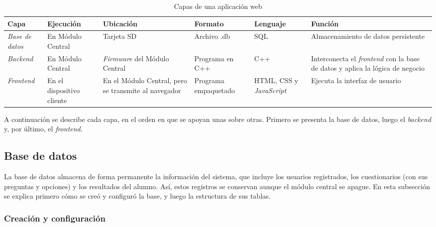 \begin{table}[H]
    \centering
    \caption{Capas de una aplicación web}
    \label{tab:capas_app_web}
    \begin{tabular}{|>{\raggedright\arraybackslash}p{}|>{\raggedright\arraybackslash}p{}|>{\raggedright\arraybackslash}p{}|>{\raggedright\arraybackslash}p{}|>{\raggedright\arraybackslash}p{}|>{\raggedright\arraybackslash}p{}|}
        \hline
        \textbf{Capa} & \textbf{Ejecución} & \textbf{Ubicación} & \textbf{Formato} & \textbf{Lenguaje} & \textbf{Función} \\
        \hline
        \emph{Base de datos} & En Módulo Central & Tarjeta SD & Archivo .db & SQL & Almacenamiento de datos persistente \\
        \hline
        \emph{Backend} & En Módulo Central & \emph{Firmware} del Módulo Central & Programa en C++ & C++ & Interconecta el \emph{frontend} con la base de datos y aplica la lógica de negocio \\
        \hline
        \emph{Frontend} & En el dispositivo cliente & En el Módulo Central, pero se transmite al navegador & Programa empaquetado & HTML, CSS y \emph{JavaScript} & Ejecuta la interfaz de usuario \\
        \hline
    \end{tabular}
\end{table}

A continuación se describe cada capa, en el orden en que se apoyan unas sobre otras. Primero se presenta la base de datos, luego el \emph{backend} y, por último, el \emph{frontend}.

\subsection{Base de datos}
\label{sec:base_datos}

La base de datos almacena de forma permanente la información del sistema, que incluye los usuarios registrados, los cuestionarios (con sus preguntas y opciones) y los resultados del alumno. Así, estos registros se conservan aunque el módulo central se apague. En esta subsección se explica primero cómo se creó y configuró la base, y luego la estructura de sus tablas.

\subsubsection{Creación y configuración}


